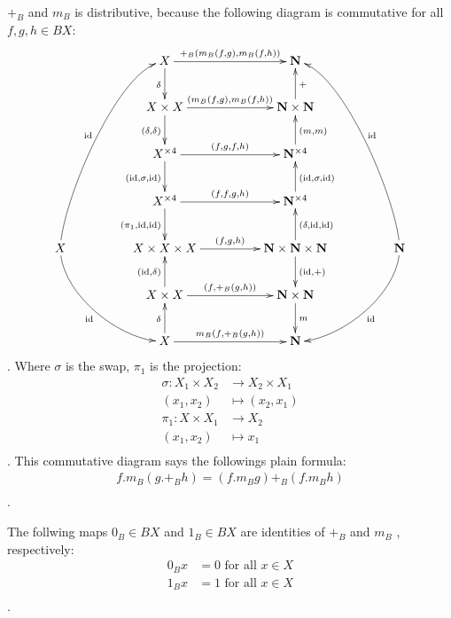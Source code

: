 $+_B$ and $m_B$ is distributive, because the following diagram is commutative
for all $f,g,h\in BX$:
\begin{equation}\xymatrix@C+24pt{
	& X \ar[r]^{+_B\kakko{m_B\kakko{f,g}, m_B\kakko{f,h}}} \ar[d]_{\delta}
	& \mybf{N}
	\\
	& X\times X \ar[r]^{\kakko{m_B\kakko{f,g}, m_B\kakko{f,h}}} \ar[d]_{(\delta,\delta)}
	& \mybf{N}\times \mybf{N} \ar[u]_{+}
	\\
	& X^{\times4} \ar[r]^{\kakko{f,g,f,h}} \ar[d]_{(\myid,\sigma,\myid)}
	& \mybf{N}^{\times4} \ar[u]_{(m,m)}
	\\
	& X^{\times4} \ar[r]^{\kakko{f,f,g,h}} \ar[d]_{(\pi_1,\myid,\myid)}
	& \mybf{N}^{\times4} \ar[u]_{(\myid,\sigma,\myid)}
	\\
	X \ar@(u,l)[ruuuu]^{\myid} \ar@(d,l)[rdd]_{\myid}
	& X\times X\times X \ar[r]^{\kakko{f,g,h}}
	& \mybf{N}\times \mybf{N}\times \mybf{N} \ar[u]_{(\delta,\myid,\myid)} \ar[d]^{(\myid,+)}
	& \mybf{N} \ar@(u,r)[luuuu]_{\myid} \ar@(d,r)[ldd]^{\myid}
	\\
	& X\times X \ar[r]^{\kakko{f,+_B\kakko{g,h}}} \ar[u]^{(\myid,\delta)}
	& \mybf{N}\times \mybf{N} \ar[d]^{m}
	\\
	& X \ar[r]^{m_B\kakko{f,+_B\kakko{g,h}}} \ar[u]^{\delta}
	& \mybf{N}
	\\
}\end{equation}
. Where $\sigma$ is the swap, $\pi_1$ is the projection:
\begin{equation}\begin{split}
	\sigma: X_1\times X_2 &\to X_2\times X_1 \\
		(x_1,x_2) &\mapsto (x_2,x_1) \\
	\pi_1: X\times X_1 &\to X_2 \\
		(x_1,x_2) &\mapsto x_1 \\
\end{split}\end{equation}
. This commutative diagram says the followings plain formula:
\begin{equation}\begin{split}
	f.m_B(g.+_Bh) = (f.m_Bg)+_B(f.m_Bh) \\
\end{split}\end{equation}
.

The follwing maps $0_B\in BX$ and $1_B\in BX$ are identities of $+_B$ and $m_B$
, respectively:
\begin{equation}\begin{split}
	0_Bx &= 0 \text{ for all }x\in X \\
	1_Bx &= 1 \text{ for all }x\in X \\
\end{split}\end{equation}
.

